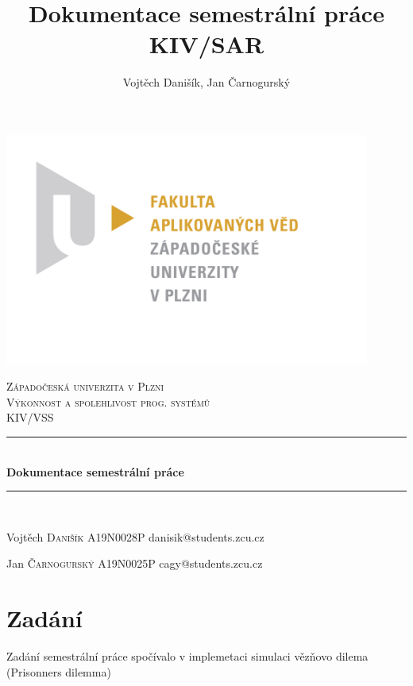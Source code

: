 \documentclass[12pt, a4paper]{article}
\title{\textbf{Dokumentace semestrální práce} \\KIV/SAR}
\author{Vojtěch Danišík, Jan Čarnogurský}
\begin{document}
\begin{titlepage}
	\newcommand{\HRule}{\rule{\linewidth}{0.5mm}}
	\begin{center}
	\includegraphics[width=12cm]{img/fav_logo}\\
	\end{center}
	\textsc{\LARGE Západočeská univerzita v Plzni}\\[1.5cm]
	\textsc{\Large Výkonnost a spolehlivost prog. systémů}\\[0.5cm]
	\textsc{\large KIV/VSS}\\[0.5cm]
	\HRule\\[0.4cm]
	{\huge\bfseries Dokumentace semestrální práce}\\[0.4cm]
	\HRule\\[1.5cm]

	\begin{minipage}{0.4\textwidth}
		\begin{flushleft}
			\large
			Vojtěch \textsc{Danišík}\newline
			A19N0028P\newline
			danisik@students.zcu.cz
		\end{flushleft}
		\begin{flushleft}
			\large
			Jan \textsc{Čarnogurský}\newline
			A19N0025P\newline
			cagy@students.zcu.cz
		\end{flushleft}
	\end{minipage}
	\vfill\vfill\vfill
	\vfill
\end{titlepage}
\newpage
\tableofcontents
\newpage

\section{Zadání}
\noindent Zadání semestrální práce spočívalo v implemetaci simulaci vězňovo dilema (Prisonner\textquotesingle s dilemma)
\end{document}
